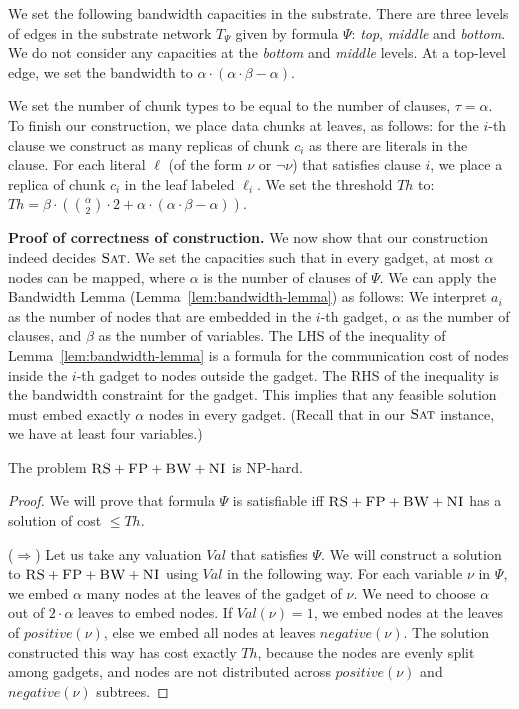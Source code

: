 \documentclass[9pt]{sigcomm-alternate}
\newcommand{\maciek}[1]{\textcolor{brown}{maciek: #1}}
\newcommand{\variab}{\nu}
\newcommand{\clauses}{\alpha}
\newcommand{\variables}{\beta}
\newcommand{\achunk}{\ensuremath{c}}
\newcommand{\CC}{\textsc{NI}}
\newcommand{\FP}{\textsc{FP}}
\newcommand{\RS}{\textsc{RS}}
\newcommand{\BW}{\textsc{BW}}
\newcommand{\Tree}{\ensuremath{T}}
\newcommand{\SAT}{\textsc{Sat}}
\newcommand{\Formula}{\ensuremath{\Psi}}
\newcommand{\Thr}{\ensuremath{Th}}
\newcommand{\positive}{\ensuremath{positive}}
\newcommand{\negative}{\ensuremath{negative}}
\newcommand{\Val}{\ensuremath{Val}}
\begin{document}
\begin{appendix}
We set the following bandwidth capacities in the substrate. There are three
levels of edges in the substrate network $\Tree_{\Formula}$ given by formula
$\Formula$: \emph{top}, \emph{middle} and \emph{bottom}.
We do not consider any capacities at the \emph{bottom} and \emph{middle} levels.
At a top-level edge, we set the bandwidth to $\clauses \cdot (\clauses
\cdot \variables -
\clauses)$.

We set the number of chunk types to be equal to the number of clauses, $\tau =
\clauses$. To finish our construction, we place data chunks at
leaves, as follows: for the $i$-th clause we
construct as many replicas of chunk $\achunk_i$ as there are literals in the
clause. For each literal $\ell$ (of the form $\variab$ or $\neg \variab$) that satisfies clause $i$,
 we place
a replica of chunk $\achunk_i$ in the leaf labeled $\ell_i$.
We set the threshold $\Thr$ to:
$ \Thr = \variables \cdot ({\clauses  \choose 2} \cdot 2 +
\clauses \cdot (\clauses
\cdot \variables - \clauses))$.

\textbf{Proof of correctness of construction.}
We now show that our construction indeed
decides $\SAT$. We set the capacities such that in every gadget,
at most $\clauses$ nodes can be mapped, where $\clauses$
is the number of clauses of $\Formula$.
We can apply the Bandwidth Lemma (Lemma~\ref{lem:bandwidth-lemma}) as follows:
We interpret $a_i$ as the
number of nodes that are embedded in the $i$-th gadget, $\clauses$
as the number
of clauses, and $\variables$ as the number of variables.
The LHS of the inequality of Lemma~\ref{lem:bandwidth-lemma}
is a formula for the communication cost of nodes inside the $i$-th
gadget to nodes outside the gadget. The RHS of the inequality is the
bandwidth constraint for the gadget. This implies that
any feasible solution must embed exactly $\clauses$ nodes in every gadget.
(Recall that in our $\SAT$ instance, we have at least four variables.)

\begin{theorem}
The problem $\RS+\FP+\BW+\CC$ is NP-hard.
\end{theorem}
\begin{proof}
We will prove that formula $\Formula$ is satisfiable iff $\RS+\FP+\BW+\CC$ has
a solution of cost $\leq \Thr$.

($\Rightarrow$) Let us take any valuation $\Val$ that satisfies $\Formula$.
We will construct a solution to $\RS+\FP+\BW+\CC$ using $\Val$ in the following
way.
For each variable $\variab$ in $\Formula$, we embed $\clauses$ many nodes
at the  leaves of the gadget of $\variab$. We need to choose $\clauses$ out of
$2 \cdot \clauses$ leaves to embed nodes. If $\Val(\variab) = 1$, we embed
nodes at the leaves
of $\positive(\variab)$, else we embed all nodes at leaves $\negative(\variab)$.
The solution constructed this way has cost exactly
$\Thr$, because the nodes are evenly split among gadgets, and nodes are not
distributed across $\positive(\variab)$ and $\negative(\variab)$ subtrees.


\end{proof}
\end{appendix}
\end{document}
